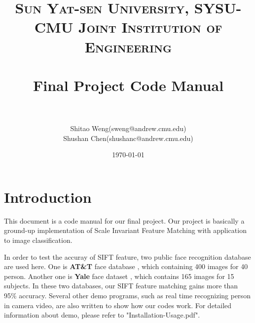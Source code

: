 \documentclass[paper=a4, fontsize=11pt]{scrartcl} %
\title{	
\normalfont \normalsize 
\textsc{Sun Yat-sen University, SYSU-CMU Joint Institution of Engineering} \\ [25pt] %
\horrule{0.5pt} \\[0.4cm] %
\huge Final Project Code Manual\\ %
\horrule{2pt} \\[0.5cm] %
}
\author{Shitao Weng(sweng@andrew.cmu.edu) \\ Shushan Chen(shushanc@andrew.cmu.edu)} %
\date{\normalsize\today} %
\numberwithin{equation}{section} %
\numberwithin{figure}{section} %
\numberwithin{table}{section} %
\begin{document}

\maketitle %

\tableofcontents

\section{Introduction}

This document is a code manual for our final project. Our project is basically a ground-up implementation of Scale Invariant Feature Matching with application to image classification.

In order to test the accuray of SIFT feature, two public face recognition database are used here. One is \textbf{AT\&T} face database \cite{att}, which containing 400 images for 40 person. Another one is \textbf{Yale} face dataset \cite{yale}, which contains 165 images for 15 subjects. In these two databases, our SIFT feature matching gains more than 95\% accuracy. Several other demo programs, such as real time recognizing person in camera video, are also written to show how our codes work. For detailed information about demo, please refer to "Installation-Usage.pdf".
\end{document}
